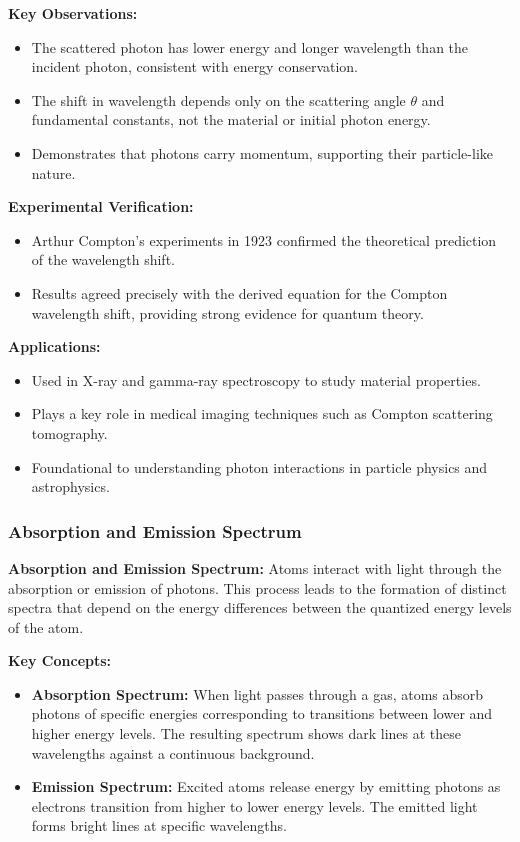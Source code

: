\documentclass{article}
\newcommand{\conceptbox}[1]{\begin{tcolorbox}[colback=blue!10] #1 \end{tcolorbox}}
\begin{document}
\conceptbox{
\textbf{Key Observations:}
\begin{itemize}
    \item The scattered photon has lower energy and longer wavelength than the incident photon, consistent with energy conservation.
    \item The shift in wavelength depends only on the scattering angle \( \theta \) and fundamental constants, not the material or initial photon energy.
    \item Demonstrates that photons carry momentum, supporting their particle-like nature.
\end{itemize}
}

\conceptbox{
\textbf{Experimental Verification:}
\begin{itemize}
    \item Arthur Compton's experiments in 1923 confirmed the theoretical prediction of the wavelength shift.
    \item Results agreed precisely with the derived equation for the Compton wavelength shift, providing strong evidence for quantum theory.
\end{itemize}
}

\conceptbox{
\textbf{Applications:}
\begin{itemize}
    \item Used in X-ray and gamma-ray spectroscopy to study material properties.
    \item Plays a key role in medical imaging techniques such as Compton scattering tomography.
    \item Foundational to understanding photon interactions in particle physics and astrophysics.
\end{itemize}
}

\subsubsection{Absorption and Emission Spectrum}
\conceptbox{
\textbf{Absorption and Emission Spectrum:}
Atoms interact with light through the absorption or emission of photons. This process leads to the formation of distinct spectra that depend on the energy differences between the quantized energy levels of the atom.

\textbf{Key Concepts:}
\begin{itemize}
    \item \textbf{Absorption Spectrum:}
    When light passes through a gas, atoms absorb photons of specific energies corresponding to transitions between lower and higher energy levels. The resulting spectrum shows dark lines at these wavelengths against a continuous background.
    \item \textbf{Emission Spectrum:}
    Excited atoms release energy by emitting photons as electrons transition from higher to lower energy levels. The emitted light forms bright lines at specific wavelengths.
\end{itemize}
}
\end{document}
